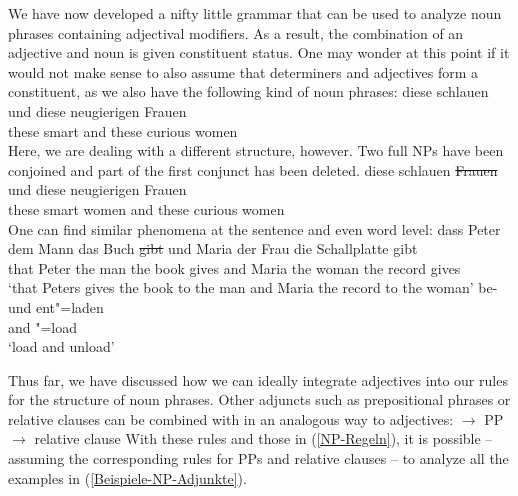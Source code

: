 We have now developed a nifty little grammar that can be used to analyze noun phrases containing
adjectival modifiers. As a result, the combination of an adjective and noun is given constituent
status. One may wonder at this point if it would not make sense to also assume that determiners and
adjectives form a constituent, as we also have the following kind of noun phrases: 
\ea
\gll diese schlauen und diese neugierigen Frauen\\
	 these smart and these curious women\\
\z
Here, we are dealing with a different structure, however. Two full NPs have been
conjoined and part of the first conjunct has been deleted.
\ea
\gll diese schlauen \st{Frauen} und diese neugierigen Frauen\\
	 these smart women and these curious women\\
\z
One can find similar phenomena at the sentence and even word level:
\eal
\ex 
\gll dass Peter dem Mann das Buch \st{gibt} und Maria der Frau die Schallplatte gibt\\
	 that Peter the man the book gives and Maria the woman the record gives\\
\glt `that Peters gives the book to the man and Maria the record to the woman'
\ex 
\gll be- und ent"=laden\\
	 \prt{} and \prt{}"=load\\
\glt `load and unload'
\zl

\noindent
Thus far, we have discussed how we can ideally integrate adjectives into our rules for the structure of noun phrases.
Other adjuncts such as prepositional phrases or relative clauses can be combined with \nbar in an analogous way to adjectives:
\eal
\ex\label{xbar-PP-Adjunkt-an-N} \nbar $\to$ \nbar PP
\ex \nbar $\to$ \nbar relative clause
\zl
With these rules and those in (\ref{NP-Regeln}), it is possible -- assuming the corresponding rules for PPs and
relative clauses -- to analyze all the examples in (\ref{Beispiele-NP-Adjunkte}).


